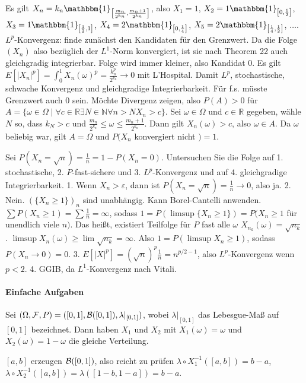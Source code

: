 \documentclass{article}
\begin{document}
Es gilt $X_n=k_n\mathbbm{1}_{\left[\frac{m_n}{2^{k_n}},\frac{m_n+1}{2^{k_n}}\right]}$, also $X_1=1$, $X_2=1\mathbbm{1}_{\left[0,\frac{1}{2}\right]}$, $X_3=1\mathbbm{1}_{\left[\frac{1}{2},1\right]}$, $X_4=2\mathbbm{1}_{\left[0,\frac{1}{4}\right]}$, $X_5=2\mathbbm{1}_{\left[\frac{1}{4},\frac{1}{2}\right]}$, $\dots$.
$L^p$-Konvergenz: finde zunächst den Kandidaten für den Grenzwert.
Da die Folge $(X_n)$ also bezüglich der $L^1$-Norm konvergiert, ist sie nach Theorem 22 auch gleichgradig integrierbar. Folge wird immer kleiner, also Kandidat 0.
Es gilt $E[|X_n|^p]=\int_0^1 X_n(\omega)^p=\frac{k_n^p}{2^{k_n}}\to0$ mit L'Hospital.
Damit $L^p$, stochastische, schwache Konvergenz und gleichgradige Integrierbarkeit.
Für f.s. müsste Grenzwert auch 0 sein.
Möchte Divergenz zeigen, also $P(A)>0$ für $A=\{\omega\in\Omega\mid\forall c\in\mathbb{R}\exists N\in\mathbb{N}\forall n>N X_n>c\}$.
Sei $\omega\in\Omega$ und $c\in\mathbb{R}$ gegeben, wähle $N$ so, dass $k_N>c$ und $\frac{m_n}{2^{k_n}}\leq\omega\leq\frac{m_n+1}{2^{k_n}}$.
Dann gilt $X_n(\omega)>c$, also $\omega\in A$.
Da $\omega$ beliebig war, gilt $A=\Omega$ und $P(X_n$ konvergiert nicht $)=1$.

Sei $P(X_n=\sqrt{n})=\frac{1}{n}=1-P(X_n=0)$.
Untersuchen Sie die Folge auf 1. stochastische, 2. $P$-fast-sichere und 3. $L^p$-Konvergenz und auf 4. gleichgradige Integrierbarkeit.
1. Wenn $X_n>\varepsilon$, dann ist $P(X_n=\sqrt{n})=\frac{1}{n}\to0$, also ja.
2. Nein. $(\{X_n\geq1\})_n$ sind unabhängig. Kann Borel-Cantelli anwenden. $\sum P(X_n\geq 1)=\sum\frac{1}{n}=\infty$, sodass $1=P(\limsup\{X_n\geq1\})=P(X_n\geq1$ für unendlich viele $n)$.
Das heißt, existiert Teilfolge für $P$ fast alle $\omega$ $X_{n_k}(\omega)=\sqrt{n_k}$.
$\limsup X_n(\omega)\geq\lim\sqrt{n_k}=\infty$.
Also $1=P(\limsup X_n\geq1)$, sodass $P(X_n\to0)=0$.
3. $E[|X|^p]=(\sqrt{n})^p\frac{1}{n}=n^{p/2-1}$, also $L^p$-Konvergenz wenn $p<2$.
4. GGIB, da $L^1$-Konvergenz nach Vitali.

\paragraph{Einfache Aufgaben}
Sei $(\Omega,{\cal F},P)=([0,1],{\cal B}([0,1]),\lambda|_{[0,1]})$, wobei $\lambda|_{[0,1]}$ das Lebesgue-Maß auf $[0,1]$ bezeichnet.
Dann haben $X_1$ und $X_2$ mit $X_1(\omega)=\omega$ und $X_2(\omega)=1-\omega$ die gleiche Verteilung.

$[a,b]$ erzeugen ${\cal B}([0,1])$, also reicht zu prüfen $\lambda\circ X_1^{-1}([a,b])=b-a$, $\lambda\circ X_2^{-1}([a,b])=\lambda([1-b,1-a])=b-a$.
\end{document}
